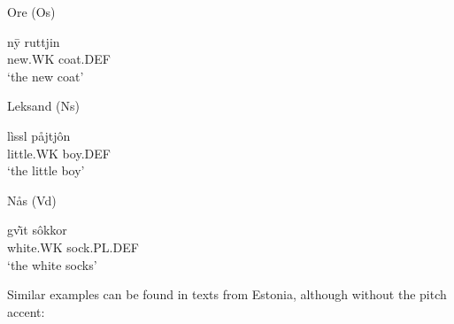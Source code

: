 
\item 

Ore (Os)



 \ea\label{}
\gll n\={y}{\textasciigrave}  ruttjin\\


new.WK  coat.DEF\\

\glt ‘the new coat’

\z

\item 

Leksand (Ns)



 \ea\label{}
\gll lìssl  påjtjôn\\


little.WK  boy.DEF\\

\glt ‘the little boy’

\z

\item 

\label{bkm:Ref140985846}Nås (Vd)



 \ea\label{}
\gll gv\`{\=\i}t  sôkkor\\


white.WK  sock.PL.DEF\\

\glt ‘the white socks’

\z

Similar examples can be found in texts from Estonia, although without the pitch accent:

